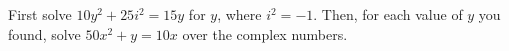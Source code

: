 First solve $10y^2+25i^2=15y$ for $y$, where $i^2=-1$. Then, for each value of $y$ you found, solve $50x^2+y=10x$ over the complex numbers.

